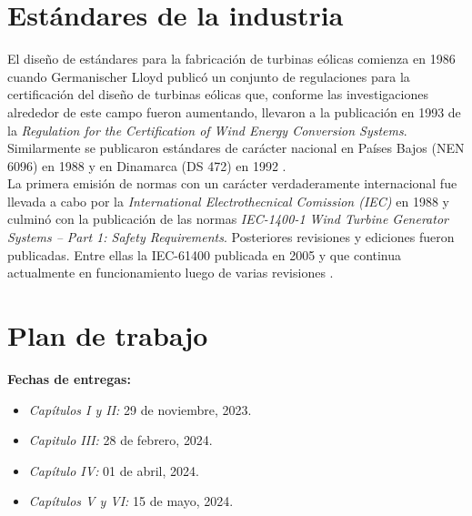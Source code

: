 \section{Estándares de la industria}
{\parindent0pt 
El diseño de estándares para la fabricación de turbinas eólicas comienza en 1986 cuando Germanischer Lloyd publicó un conjunto de regulaciones para la certificación del diseño de turbinas eólicas que, conforme las investigaciones alrededor de este campo fueron aumentando, llevaron a la publicación en 1993 de la \emph{Regulation for the Certification of Wind Energy Conversion Systems}. Similarmente se publicaron estándares de carácter nacional en Países Bajos (NEN 6096) en 1988 y en Dinamarca (DS 472) en 1992 \cite{Burton2011}.
\\

La primera emisión de normas con un carácter verdaderamente internacional fue llevada a cabo por la \emph{International Electrothecnical Comission (IEC)} en 1988 y culminó con la publicación de las normas \emph{IEC-1400-1 Wind Turbine Generator Systems – Part 1: Safety Requirements}. Posteriores revisiones y ediciones fueron publicadas. Entre ellas la IEC-61400 publicada en 2005 y que continua actualmente en funcionamiento luego de varias revisiones \cite{Burton2011}.
}

\section{Plan de trabajo}

\textbf{Fechas de entregas:}
\begin{itemize}
    \item \emph{Capítulos I y II:} 29 de noviembre, 2023.

    \item \emph{Capitulo III:} 28 de febrero, 2024.

    \item \emph{Capítulo IV:} 01 de abril, 2024.

    \item \emph{Capítulos V y VI:} 15 de mayo, 2024. 
\end{itemize}

